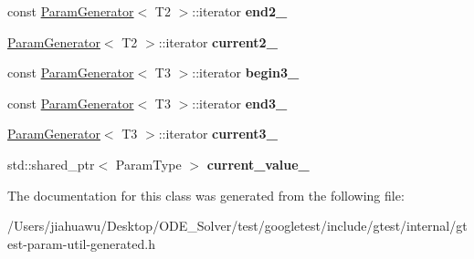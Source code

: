 \begin{DoxyCompactItemize}
const \mbox{\hyperlink{classtesting_1_1internal_1_1_param_generator}{Param\+Generator}}$<$ T2 $>$\+::iterator {\bfseries end2\+\_\+}
\item 
\mbox{\label{classtesting_1_1internal_1_1_cartesian_product_generator3_1_1_iterator_ada694e2af08d227c29477bddcb519f36}} 
\mbox{\hyperlink{classtesting_1_1internal_1_1_param_generator}{Param\+Generator}}$<$ T2 $>$\+::iterator {\bfseries current2\+\_\+}
\item 
\mbox{\label{classtesting_1_1internal_1_1_cartesian_product_generator3_1_1_iterator_a33c84fd689685eba0213b8f21c747bbd}} 
const \mbox{\hyperlink{classtesting_1_1internal_1_1_param_generator}{Param\+Generator}}$<$ T3 $>$\+::iterator {\bfseries begin3\+\_\+}
\item 
\mbox{\label{classtesting_1_1internal_1_1_cartesian_product_generator3_1_1_iterator_a7260bfbe64049028d0cb5d23c2118410}} 
const \mbox{\hyperlink{classtesting_1_1internal_1_1_param_generator}{Param\+Generator}}$<$ T3 $>$\+::iterator {\bfseries end3\+\_\+}
\item 
\mbox{\label{classtesting_1_1internal_1_1_cartesian_product_generator3_1_1_iterator_ab2a3d07bff4c4b9287e362e37be23995}} 
\mbox{\hyperlink{classtesting_1_1internal_1_1_param_generator}{Param\+Generator}}$<$ T3 $>$\+::iterator {\bfseries current3\+\_\+}
\item 
\mbox{\label{classtesting_1_1internal_1_1_cartesian_product_generator3_1_1_iterator_a45fbcc1be2697e644f077276cf31e16e}} 
std\+::shared\+\_\+ptr$<$ Param\+Type $>$ {\bfseries current\+\_\+value\+\_\+}
\end{DoxyCompactItemize}


The documentation for this class was generated from the following file\+:\begin{DoxyCompactItemize}
\item 
/\+Users/jiahuawu/\+Desktop/\+O\+D\+E\+\_\+\+Solver/test/googletest/include/gtest/internal/gtest-\/param-\/util-\/generated.\+h\end{DoxyCompactItemize}
